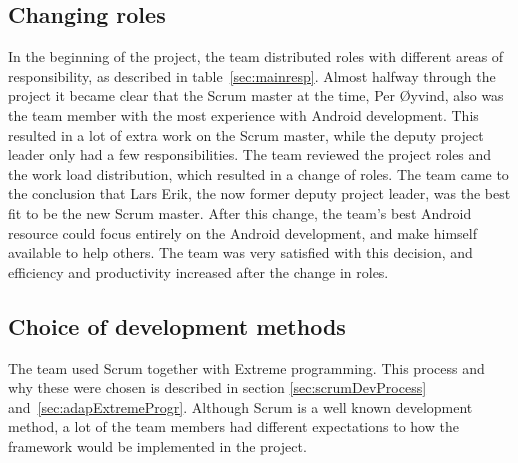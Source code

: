 \subsection{Changing roles}
\label{sec:unbalancedWorkload}
In the beginning of the project, the team distributed roles with different areas of responsibility, as described in table~\ref{sec:mainresp}. Almost halfway through the project it became clear that the Scrum master at the time, Per Øyvind, also was the team member with the most experience with Android development. This resulted in a lot of extra work on the Scrum master, while the deputy project leader only had a few responsibilities. The team reviewed the project roles and the work load distribution, which resulted in a change of roles. The team came to the conclusion that Lars Erik, the now former deputy project leader, was the best fit to be the new Scrum master. After this change, the team's best Android resource could focus entirely on the Android development, and make himself available to help others. The team was very satisfied with this decision, and efficiency and productivity increased after the change in roles.


\subsection{Choice of development methods}

The team used Scrum together with Extreme programming. This process and why these were chosen is described in section \ref{sec:scrumDevProcess} and~\ref{sec:adapExtremeProgr}. Although Scrum is a well known development method, a lot of the team members had different expectations to how the framework would be implemented in the project.

